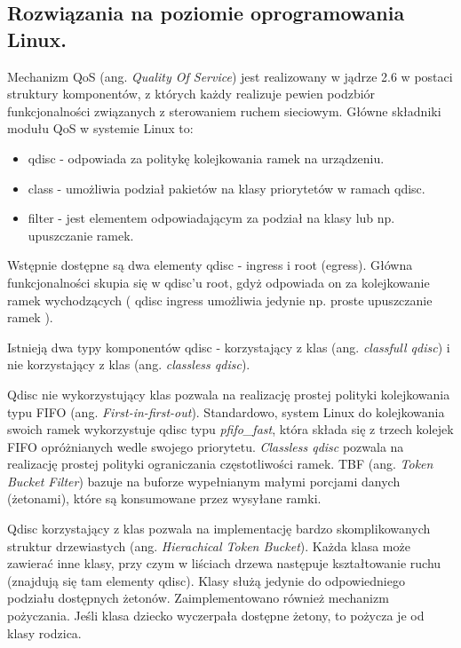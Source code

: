 \subsection{Rozwiązania na poziomie oprogramowania Linux.}

Mechanizm QoS (ang. \emph{Quality Of Service}) jest realizowany w jądrze 2.6 w postaci struktury komponentów, z których każdy realizuje pewien podzbiór funkcjonalności związanych z sterowaniem ruchem sieciowym. Główne składniki modułu QoS w systemie Linux to:

\begin{itemize}
\item qdisc - odpowiada za politykę kolejkowania ramek na urządzeniu.
\item class - umożliwia podział pakietów na klasy priorytetów w ramach qdisc.
\item filter - jest elementem odpowiadającym za podział na klasy lub np. upuszczanie ramek.
\end{itemize}

Wstępnie dostępne są dwa elementy qdisc - ingress i root (egress). Główna funkcjonalności skupia się w qdisc'u root, gdyż odpowiada on za kolejkowanie ramek wychodzących ( qdisc ingress umożliwia jedynie np. proste upuszczanie ramek ).

Istnieją dwa typy komponentów qdisc - korzystający z klas (ang. \emph{classfull qdisc}) i nie korzystający z klas (ang. \emph{classless qdisc}). 

Qdisc nie wykorzystujący klas pozwala na realizację prostej polityki kolejkowania typu FIFO (ang. \emph{First-in-first-out}). Standardowo, system Linux do kolejkowania swoich ramek wykorzystuje qdisc typu \emph{pfifo\_fast}, która składa się z trzech kolejek FIFO opróżnianych wedle swojego priorytetu. \emph{Classless qdisc} pozwala na realizację prostej polityki ograniczania częstotliwości ramek. TBF (ang. \emph{Token Bucket Filter}) bazuje na buforze wypełnianym małymi porcjami danych (żetonami), które są konsumowane przez wysyłane ramki.

Qdisc korzystający z klas pozwala na implementację bardzo skomplikowanych struktur drzewiastych (ang. \emph{Hierachical Token Bucket}). Każda klasa może zawierać inne klasy, przy czym w liściach drzewa następuje kształtowanie ruchu (znajdują się tam elementy qdisc). Klasy służą jedynie do odpowiedniego podziału dostępnych żetonów. Zaimplementowano również mechanizm pożyczania. Jeśli klasa dziecko wyczerpała dostępne żetony, to pożycza je od klasy rodzica.

